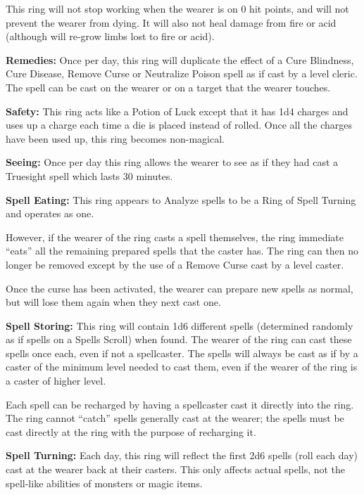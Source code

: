 \begin{multicols*}{2}
This ring will not stop working when the wearer is on 0 hit points, and will not prevent the wearer from dying. It will also not heal damage from fire or acid (although will re-grow limbs lost to fire or acid).

\textbf{Remedies:} Once per day, this ring will duplicate the effect of a Cure Blindness, Cure Disease, Remove Curse or Neutralize Poison spell as if cast by a  level cleric. The spell can be cast on the wearer or on a target that the wearer touches.

\textbf{Safety:} This ring acts like a Potion of Luck except that it has 1d4 charges and uses up a charge each time a die is placed instead of rolled. Once all the charges have been used up, this ring becomes non-magical.

\textbf{Seeing:} Once per day this ring allows the wearer to see as if they had cast a Truesight spell which lasts 30 minutes.

\textbf{Spell Eating:} This ring appears to Analyze spells to be a Ring of Spell Turning and operates as one.

However, if the wearer of the ring casts a spell themselves, the ring immediate “eats” all the remaining prepared spells that the caster has. The ring can then no longer be removed except by the use of a Remove Curse cast by a  level caster.

Once the curse has been activated, the wearer can prepare new spells as normal, but will lose them again when they next cast one.

\textbf{Spell Storing:} This ring will contain 1d6 different spells (determined randomly as if spells on a Spells Scroll) when found. The wearer of the ring can cast these spells once each, even if not a spellcaster. The spells will always be cast as if by a caster of the minimum level needed to cast them, even if the wearer of the ring is a caster of higher level.

Each spell can be recharged by having a spellcaster cast it directly into the ring. The ring cannot “catch” spells generally cast at the wearer; the spells must be cast directly at the ring with the purpose of recharging it.

\textbf{Spell Turning:} Each day, this ring will reflect the first 2d6 spells (roll each day) cast at the wearer back at their casters. This only affects actual spells, not the spell-like abilities of monsters or magic items.


\end{multicols*}
